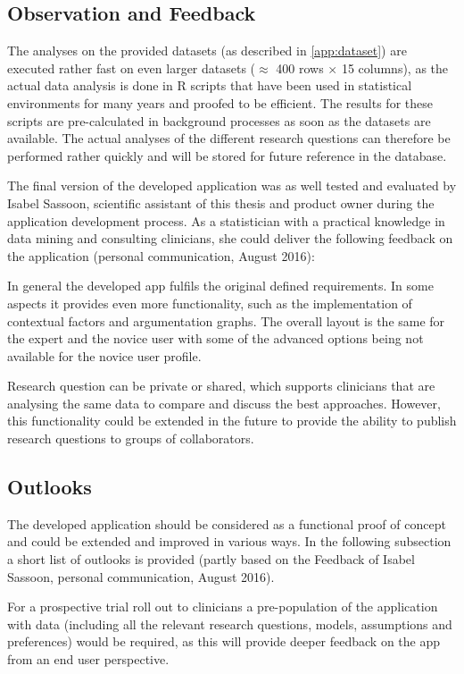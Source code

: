 \subsection{Observation and Feedback}
\sloppy

The analyses on the provided datasets (as described in \autoref{app:dataset}) are executed rather fast on even larger datasets ($\approx$ 400 rows $\times$ 15 columns), as the actual data analysis is done in \gls{R} scripts that have been used in statistical environments for many years and proofed to be efficient. The results for these scripts are pre-calculated in background processes as soon as the datasets are available. The actual analyses of the different research questions can therefore be performed rather quickly and will be stored for future reference in the database.

The final version of the developed application was as well tested and evaluated by Isabel Sassoon, scientific assistant of this thesis and product owner during the application development process. As a statistician with a practical knowledge in data mining and consulting clinicians, she could deliver the following feedback on the application (personal communication, August 2016):

In general the developed app fulfils the original defined requirements. In some aspects it provides even more functionality, such as the implementation of contextual factors and argumentation graphs. The overall layout is the same for the expert and the novice user with some of the advanced options being not available for the novice user profile.

Research question can be private or shared, which supports clinicians that are analysing the same data to compare and discuss the best approaches. However, this functionality could be extended in the future to provide the ability to publish research questions to groups of collaborators.


\subsection{Outlooks}
\label{sub:outlooks}

The developed application should be considered as a functional proof of concept and could be extended and improved in various ways. In the following subsection a short list of outlooks is provided (partly based on the Feedback of Isabel Sassoon, personal communication, August 2016).

For a prospective trial roll out to clinicians a pre-population of the application with data (including  all the relevant research questions, models, assumptions and preferences) would be required, as this will provide deeper feedback on the app from an end user perspective.


